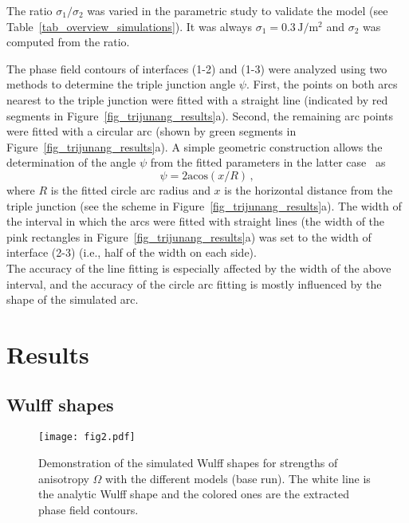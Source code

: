 The ratio $\sigma_1/\sigma_2$ was varied in the parametric study to validate the model (see Table~\ref{tab_overview_simulations}). It was always $\sigma_1=0.3\,\mathrm{J/m^2}$ and $\sigma_2$ was computed from the ratio.

The phase field contours of interfaces (1-2) and (1-3) were analyzed using two methods to determine the triple junction angle $\psi$. First, the points on both arcs nearest to the triple junction were fitted with a straight line (indicated by red segments in Figure~\ref{fig_trijunang_results}a). Second, the remaining arc points were fitted with a circular arc (shown by green segments in Figure~\ref{fig_trijunang_results}a). A simple geometric construction allows the determination of the angle $\psi$ from the fitted parameters in the latter case~\cite{Moelans2009} as
\begin{equation}
	\psi = 2\mathrm{acos}(x/R)\,,
\end{equation}
where $R$ is the fitted circle arc radius and $x$ is the horizontal distance from the triple junction (see the scheme in Figure~\ref{fig_trijunang_results}a). The width of the interval in which the arcs were fitted with straight lines (the width of the pink rectangles in Figure~\ref{fig_trijunang_results}a) was set to the width of interface (2-3) (i.e., half of the width on each side).\\
The accuracy of the line fitting is especially affected by the width of the above interval, and the accuracy of the circle arc fitting is mostly influenced by the shape of the simulated arc.


\section{Results}
\label{sec_Results}

\subsection{Wulff shapes}
\begin{figure}
	\centering
	\texttt{[image: fig2.pdf]}
	\caption[Demonstration of the simulated Wulff shapes]{Demonstration of the simulated Wulff shapes for strengths of anisotropy $\Omega$ with the different models (base run). The white line is the analytic Wulff shape and the colored ones are the extracted phase field contours.}
	\label{fig_wulff_demo_shapes}
\end{figure}

